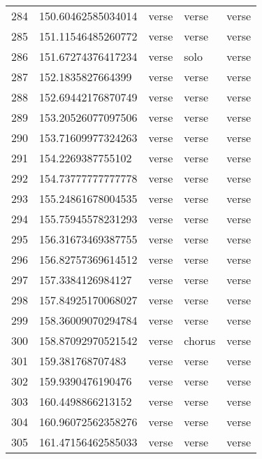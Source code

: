 \begin{table}[]
\begin{tabular}{lllll}
    284  & 150.60462585034014 & verse        & verse           & verse          \\
    285  & 151.11546485260772 & verse        & verse           & verse          \\
    286  & 151.67274376417234 & verse        & solo            & verse          \\
    287  & 152.1835827664399  & verse        & verse           & verse          \\
    288  & 152.69442176870749 & verse        & verse           & verse          \\
    289  & 153.20526077097506 & verse        & verse           & verse          \\
    290  & 153.71609977324263 & verse        & verse           & verse          \\
    291  & 154.2269387755102  & verse        & verse           & verse          \\
    292  & 154.73777777777778 & verse        & verse           & verse          \\
    293  & 155.24861678004535 & verse        & verse           & verse          \\
    294  & 155.75945578231293 & verse        & verse           & verse          \\
    295  & 156.31673469387755 & verse        & verse           & verse          \\
    296  & 156.82757369614512 & verse        & verse           & verse          \\
    297  & 157.3384126984127  & verse        & verse           & verse          \\
    298  & 157.84925170068027 & verse        & verse           & verse          \\
    299  & 158.36009070294784 & verse        & verse           & verse          \\
    300  & 158.87092970521542 & verse        & chorus          & verse          \\
    301  & 159.381768707483   & verse        & verse           & verse          \\
    302  & 159.9390476190476  & verse        & verse           & verse          \\
    303  & 160.4498866213152  & verse        & verse           & verse          \\
    304  & 160.96072562358276 & verse        & verse           & verse          \\
    305  & 161.47156462585033 & verse        & verse           & verse          \\

\end{tabular}
\end{table}
